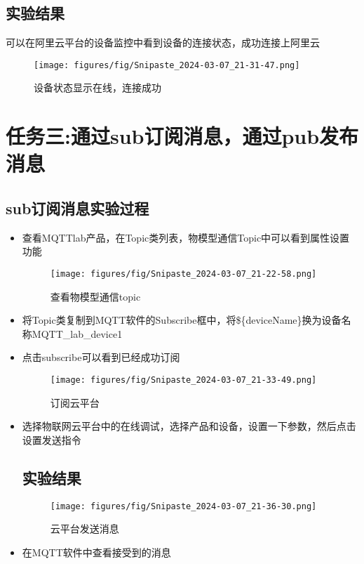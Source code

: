 \documentclass[12pt,hyperref,a4paper,UTF8]{ctexart}
\begin{document}
\subsection{实验结果}
    可以在阿里云平台的设备监控中看到设备的连接状态，成功连接上阿里云
    \begin{figure}[H]
        \centering
        \texttt{[image: figures/fig/Snipaste\_2024-03-07\_21-31-47.png]}
        \caption{设备状态显示在线，连接成功}
        \label{fig:enter-label}
    \end{figure}



\section{任务三:通过sub订阅消息，通过pub发布消息}
\subsection{sub订阅消息实验过程}


\begin{itemize}[itemsep=-5pt, topsep=0pt, partopsep=0pt]
    \item 查看MQTTlab产品，在Topic类列表，物模型通信Topic中可以看到属性设置功能
    \begin{figure}[H]
        \centering
        \texttt{[image: figures/fig/Snipaste\_2024-03-07\_21-22-58.png]}
        \caption{查看物模型通信topic}
        \label{fig:enter-label}
    \end{figure}
    \item 将Topic类复制到MQTT软件的Subscribe框中，将\$\{deviceName\}换为设备名称MQTT\_lab\_device1
    \item 点击subscribe可以看到已经成功订阅
    \begin{figure}[H]
        \centering
        \texttt{[image: figures/fig/Snipaste\_2024-03-07\_21-33-49.png]}
        \caption{订阅云平台}
        \label{fig:enter-label}
    \end{figure}

    \item 选择物联网云平台中的在线调试，选择产品和设备，设置一下参数，然后点击设置发送指令
    \subsection{实验结果}
    \begin{figure}[H]
        \centering
        \texttt{[image: figures/fig/Snipaste\_2024-03-07\_21-36-30.png]}
        \caption{云平台发送消息}
        \label{fig:enter-label}
    \end{figure}

    \item 在MQTT软件中查看接受到的消息


\end{itemize}
\end{document}
